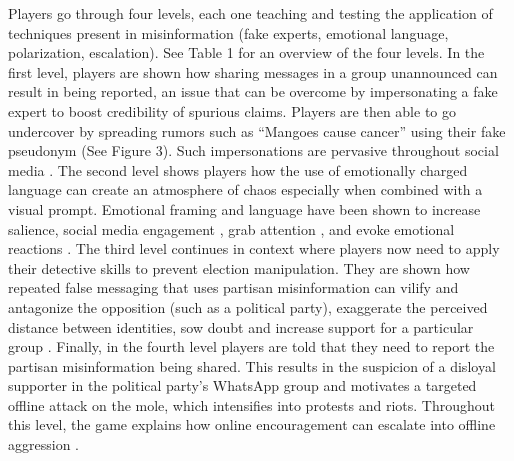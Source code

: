 \documentclass[empirical, authordate]{jote-new-article}
\begin{document}
\emph{}Players go through four levels, each one teaching and testing the application of techniques present in misinformation (fake experts, emotional language, polarization, escalation). See Table 1 for an overview of the four levels. In the first level, players are shown how sharing messages in a group unannounced can result in being reported, an issue that can be overcome by impersonating a fake expert to boost credibility of spurious claims. Players are then able to go undercover by spreading rumors such as “Mangoes cause cancer” using their fake pseudonym (See Figure 3). Such impersonations are pervasive throughout social media \parencite{Adewole2017, Goga2015, Jung2011, Reznik2013}. The second level shows players how the use of emotionally charged language can create an atmosphere of chaos especially when combined with a visual prompt. Emotional framing and language have been shown to increase salience, social media engagement \parencite{Rathje2021}, grab attention \parencite{Konijn2012}, and evoke emotional reactions \parencite{Gross2004}. The third level continues in context where players now need to apply their detective skills to prevent election manipulation. They are shown how repeated false messaging that uses partisan misinformation can vilify and antagonize the opposition (such as a political party), exaggerate the perceived distance between identities, sow doubt and increase support for a particular group \parencite{Groenendyk2018, Iyengar2018, Melki2014}. Finally, in the fourth level players are told that they need to report the partisan misinformation being shared. This results in the suspicion of a disloyal supporter in the political party's \mbox{WhatsApp} group and motivates a targeted offline attack on the mole, which intensifies into protests and riots. Throughout this level, the game explains how online encouragement can escalate into offline aggression \parencite{BBCMonitoring2021, Robb2021}.
\end{document}
